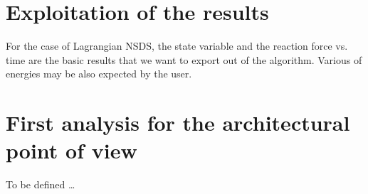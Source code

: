 \documentclass[10pt]{article}
\begin{document}




\section{Exploitation of the results}
\label{Sec:Results}

For the case of Lagrangian NSDS, the state variable and the reaction force vs. time are the basic results that we want to export out of the algorithm. Various of energies may be also expected by the user. 


\section{First analysis for the architectural point of view}
\label{Sec:Analysis}

To be defined \ldots
\end{document}
